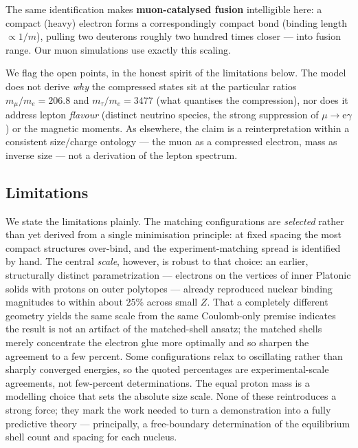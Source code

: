 \documentclass[11pt]{article}
\begin{document}
The same identification makes \textbf{muon-catalysed fusion} intelligible here: a compact (heavy) electron
forms a correspondingly compact bond (binding length ${\propto}1/m$), pulling two deuterons roughly two
hundred times closer --- into fusion range. Our muon simulations use exactly this scaling.

We flag the open points, in the honest spirit of the limitations below. The model does not derive \emph{why}
the compressed states sit at the particular ratios $m_\mu/m_e=206.8$ and $m_\tau/m_e=3477$ (what quantises the
compression), nor does it address lepton \emph{flavour} (distinct neutrino species, the strong suppression of
$\mu\to\mathrm{e}\gamma$) or the magnetic moments. As elsewhere, the claim is a reinterpretation within a
consistent size/charge ontology --- the muon as a compressed electron, mass as inverse size --- not a
derivation of the lepton spectrum.

\subsection{Limitations}

We state the limitations plainly. The matching configurations are \emph{selected} rather than
yet derived from a single minimisation principle: at fixed spacing the most compact structures
over-bind, and the experiment-matching spread is identified by hand. The central \emph{scale},
however, is robust to that choice: an earlier, structurally distinct parametrization --- electrons
on the vertices of inner Platonic solids with protons on outer polytopes --- already reproduced
nuclear binding magnitudes to within about $25\%$ across small $Z$. That a completely different
geometry yields the same scale from the same Coulomb-only premise indicates the result is not an
artifact of the matched-shell ansatz; the matched shells merely concentrate the electron glue more
optimally and so sharpen the agreement to a few percent. Some configurations relax
to oscillating rather than sharply converged energies, so the quoted percentages are
experimental-scale agreements, not few-percent determinations. The equal proton mass is a
modelling choice that sets the absolute size scale. None of these reintroduces a strong force;
they mark the work needed to turn a demonstration into a fully predictive theory --- principally,
a free-boundary determination of the equilibrium shell count and spacing for each nucleus.
\end{document}

